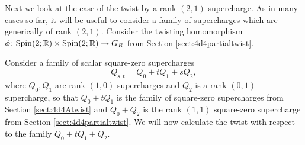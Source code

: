 \documentclass[10pt, oneside]{article}
\begin{document}
Next we look at the case of the twist by a rank $(2,1)$ supercharge. 
As in many cases so far, it will be useful to consider a family of supercharges which are generically of rank $(2,1)$. Consider the twisting homomorphism $\phi\colon \mathrm{Spin}(2; \mathbb R)\times \mathrm{Spin}(2; \mathbb R)\to G_R$ from Section \ref{sect:4d4partialtwist}.

Consider a family of scalar square-zero supercharges
\begin{equation}
Q_{s, t} = Q_0 + t Q_1 + sQ_2,
\label{eq:4d412Hodgefamily}
\end{equation}
where $Q_0,Q_1$ are rank $(1, 0)$ supercharges and $Q_2$ is a rank $(0, 1)$ supercharge, so that $Q_0 + t Q_1$ is the family of square-zero supercharges from Section \ref{sect:4d4Atwist} and $Q_0 + Q_2$ is the rank $(1, 1)$ square-zero supercharge from Section \ref{sect:4d4partialtwist}. We will now calculate the twist with respect to the family $Q_0 + tQ_1 + Q_2$.
\end{document}
